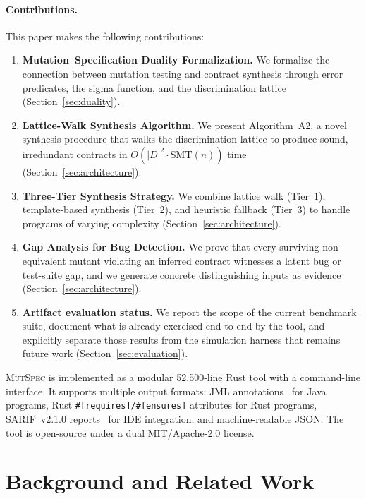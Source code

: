 \documentclass[11pt]{article}
\begin{document}
\paragraph{Contributions.} This paper makes the following contributions:
\begin{enumerate}[leftmargin=*]
  \item \textbf{Mutation--Specification Duality Formalization.} We formalize the
    connection between mutation testing and contract synthesis through error
    predicates, the sigma function, and the discrimination lattice
    (Section~\ref{sec:duality}).

  \item \textbf{Lattice-Walk Synthesis Algorithm.} We present Algorithm~A2, a
    novel synthesis procedure that walks the discrimination lattice to produce
    sound, irredundant contracts in $O(|D|^2 \cdot \mathrm{SMT}(n))$ time
    (Section~\ref{sec:architecture}).

  \item \textbf{Three-Tier Synthesis Strategy.} We combine lattice walk
    (Tier~1), template-based synthesis (Tier~2), and heuristic fallback (Tier~3)
    to handle programs of varying complexity (Section~\ref{sec:architecture}).

  \item \textbf{Gap Analysis for Bug Detection.} We prove that every surviving
    non-equivalent mutant violating an inferred contract witnesses a latent bug
    or test-suite gap, and we generate concrete distinguishing inputs as evidence
    (Section~\ref{sec:architecture}).

  \item \textbf{Artifact evaluation status.} We report the scope of the current benchmark suite, document what is already exercised end-to-end by the tool, and explicitly separate those results from the simulation harness that remains future work (Section~\ref{sec:evaluation}).
\end{enumerate}

\textsc{MutSpec} is implemented as a modular 52,500-line Rust tool with a
command-line interface. It supports multiple output formats: JML
annotations~\cite{leavens2006} for Java programs, Rust
\texttt{\#[requires]/\#[ensures]} attributes for Rust programs, SARIF~v2.1.0
reports~\cite{oasis2020sarif} for IDE integration, and machine-readable JSON.
The tool is open-source under a dual MIT/Apache-2.0 license.

\section{Background and Related Work}
\label{sec:related}
\end{document}
